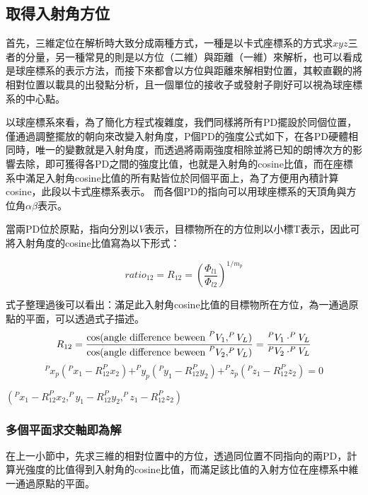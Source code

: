 \subsection{取得入射角方位}

首先，三維定位在解析時大致分成兩種方式，一種是以卡式座標系的方式求$xyz$三者的分量，另一種常見的則是以方位（二維）與距離（一維）來解析，也可以看成是球座標系的表示方法，而接下來都會以方位與距離來解相對位置，其較直觀的將相對位置以載具的出發點分析，且一個單位的接收子或發射子剛好可以視為球座標系的中心點。

以球座標系來看，為了簡化方程式複雜度，我們同樣將所有PD擺設於同個位置，僅通過調整擺放的朝向來改變入射角度，P個PD的強度公式如下，在各PD硬體相同時，唯一的變數就是入射角度，而透過將兩兩強度相除並將已知的朗博次方的影響去除，即可獲得各PD之間的強度比值，也就是入射角的cosine比值，而在座標系中滿足入射角cosine比值的所有點皆位於同個平面上，為了方便用內積計算cosine，此段以卡式座標系表示。
而各個PD的指向可以用球座標系的天頂角與方位角$\alpha\beta$表示。

當兩PD位於原點，指向分別以$V$表示，目標物所在的方位則以小標T表示，因此可將入射角度的cosine比值寫為以下形式：

\begin{equation}
    ratio_{12}=R_{12}=\left(\frac{\Phi_{l1}}{\Phi_{l2}}\right)^{1/m_p}
    \end{equation}

式子整理過後可以看出：滿足此入射角cosine比值的目標物所在方位，為一通過原點的平面，可以透過式子描述。
\begin{equation}
    R_{12} =\frac{ \cos(\text{angle difference beween }^{P}V_1,^{P}V_L)}{\cos(\text{angle difference beween }^{P}V_2,^{P}V_L)} \\
    =\frac{^{P}V_1\cdot^{P}V_L}{^{P}V_2\cdot^{P}V_L}
\end{equation}
\begin{equation}
    ^{P}x_p(^{P}x_1-R_{12}^{P}x_2)+^{P}y_p(^{P}y_1-R_{12}^{P}y_2)+^{P}z_p(^{P}z_1-R_{12}^{P}z_2)=0
\end{equation}

$(^{P}x_1-R_{12}^{P}x_2,^{P}y_1-R_{12}^{P}y_2,^{P}z_1-R_{12}^{P}z_2)$

\subsubsection{多個平面求交軸即為解}

在上一小節中，先求三維的相對位置中的方位，透過同位置不同指向的兩PD，計算光強度的比值得到入射角的cosine比值，而滿足該比值的入射方位在座標系中維一通過原點的平面。

